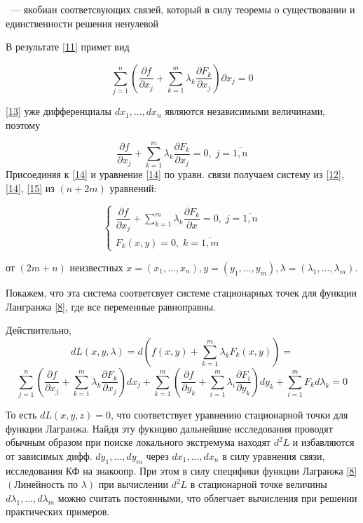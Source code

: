 \documentclass[../../main.tex]{subfiles}
\begin{document}
	~--- якобиан соответсвующих связей, который в силу теоремы о существовании
	и единственности решения ненулевой 
	
	
	В результате \eqref{11} 
	примет вид
	
	\begin{equation}
	\label{13}
	\sum\limits_{j=1}^{n}\left(  \dfrac{\partial f }{\partial x_j} + 
	\sum\limits_{k=1}^{m} \lambda_k\dfrac{\partial F_k }{\partial x_j}  
	\right) \partial x_j =0 
	\end{equation}
	
	\eqref{13} уже дифференциалы
	$d x_1,\ldots,d x_n$ являются независимыми величинами, поэтому
	
	\[
	\label{14}
	\dfrac{\partial f }{\partial x_j} + \sum\limits_{k=1}^{m}
	\lambda_k \dfrac{\partial F_k }{\partial x_j} = 0,\; j = \overline{1, n}
	\]
	Присоединяя к \eqref{14}  и уравнение \eqref{14} по 
	уравн. связи получаем \smallskip систему из \eqref{12}, 
	\eqref{14},
	\eqref{15} из $ \left( n + 2m \right) $ уравнений:
	
	\begin{equation}
	\begin{cases}
	\dfrac{\partial f }{\partial x_j} + \sum\limits_{k=1}^{m}
	\lambda_k \dfrac{\partial F_k }{\partial x} = 0,\; j = \overline{1, n}\\
	F_k\left( x, y \right) = 0,\; k = \overline{1, m}
	\end{cases}
	\end{equation}
	
	от $ \left( 2m + n \right) $ неизвестных $x = \left( x_1, \ldots, x_n \right),
	y = \left( y_1, \ldots, y_m \right), \lambda = \left( \lambda_1,
	\ldots, \lambda_m \right) $.
	
	Покажем, что эта система соответсвует системе стационарных точек для
	функции Лангранжа \eqref{8}, где все переменные равноправны.
	
	Действительно, 
	\[dL\left( x, y, \lambda \right) = d\left( f\left( x, y\right) 
	+ \sum\limits_{k=1}^{m}\lambda_k F_k\left( x, y \right) \right) =\]
	\[
	\sum\limits_{j=1}^{n}\left( \dfrac{\partial f}{\partial x_j} 
	+ \sum\limits_{k=1}^{m}\lambda_k \dfrac{\partial F_k}{\partial x_j}  
	\right)d x_j + \sum\limits_{k=1}^{m} \left( \dfrac{\partial f}{\partial y_k} 
	+ \sum\limits_{i=1}^{m}\lambda_i \dfrac{\partial F_i}{\partial y_k}  \right)
	d 	y_k + \sum\limits_{i=1}^{m} F_k d \lambda_k = 0\]
	
	То есть $dL\left( x, y, z \right) = 0$, что соответствует уравнению 
	стационарной точки для функции Лагранжа. Найдя эту фукнцию дальнейшие
	исследования проводят обычным образом при поиске локального экстремума 
	находят $d^2L$ и избавляются от зависимых дифф. $d y_1, \ldots, d y_m $ 
	через $d x_1, \ldots, d x_n$ в силу уравнения связи, исследования КФ на 
	знакоопр. При этом в силу специфики функции Лагранжа \eqref{8} 
	$\left( \text{Линейность по } \lambda \right) $ при вычислении $d^2 L$
	в стационарной точке величины $d \lambda_1, \ldots, d \lambda_m$ можно
	считать постоянными, что облегчает вычисления при решении практических
	примеров.
	
\end{document}
